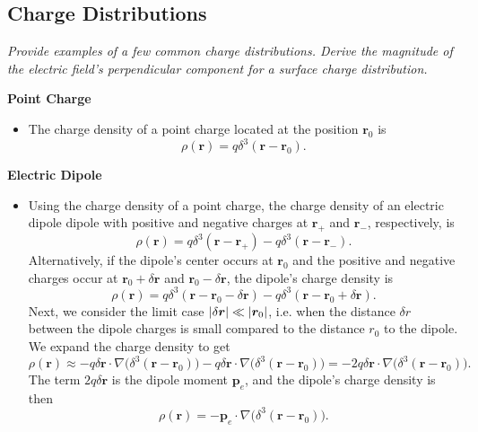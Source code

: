 \documentclass[11pt, a4paper]{article}
\renewcommand{\vec}[1]{\bm{#1}} %
\renewcommand{\r}{\vec{r}}
\newcommand{\pe}{\vec{p}_{e}}  %
\renewcommand{\grad}{\nabla}
\begin{document}
\begin{itemize}
\end{itemize}






\subsection{Charge Distributions}
\textit{Provide examples of a few common charge distributions. Derive the magnitude of the electric field's perpendicular component for a surface charge distribution.}
    
\vspace{2mm}
\textbf{Point Charge} 
\begin{itemize}
	\item The charge density of a point charge located at the position $ \r_{0} $ is
	\begin{equation*}
		\rho (\r) = q \delta^{3}(\r - \r_{0}).
	\end{equation*}
\end{itemize}	
	

\textbf{Electric Dipole} 
\begin{itemize}
	\item Using the charge density of a point charge, the charge density of an electric dipole dipole with positive and negative charges at $ \r_{+} $ and $ \r_{-} $, respectively, is
	\begin{equation*}
		\rho(\r) = q \delta^{3}(\r - \r_{+}) - q \delta^{3}(\r - \r_{-}).
	\end{equation*}
	Alternatively, if the dipole's center occurs at $ \r_{0} $ and the positive and negative charges occur at $ \r_{0} + \delta \r$ and $ \r_{0} - \delta \r $, the dipole's charge density is
	\begin{equation*}
		\rho(\r) = q \delta^{3}(\r - \r_{0} - \delta \r) - q\delta^{3}(\r - \r_{0} + \delta \r).
	\end{equation*}
	Next, we consider the limit case $ \abs{\delta \r} \ll \abs{\r_{0}} $, i.e. when the distance $ \delta r $ between the dipole charges is small compared to the distance $ r_{0} $ to the dipole. We expand the charge density to get
	\begin{equation*}
		\rho(\r) \approx - q \delta \r \cdot \grad \big(\delta^{3}(\r - \r_{0})\big) - q \delta \r \cdot \grad \big(\delta^{3}(\r - \r_{0})\big) = -2 q \delta \r \cdot \grad \big(\delta^{3}(\r - \r_{0})\big).
	\end{equation*}
	The term $ 2q\delta \r $ is the dipole moment $ \pe $, and the dipole's charge density is then
	\begin{equation*}
		\rho(\r) = -\pe \cdot \grad \big(\delta^{3}(\r - \r_{0})\big).
	\end{equation*}

\end{itemize}
\end{document}
